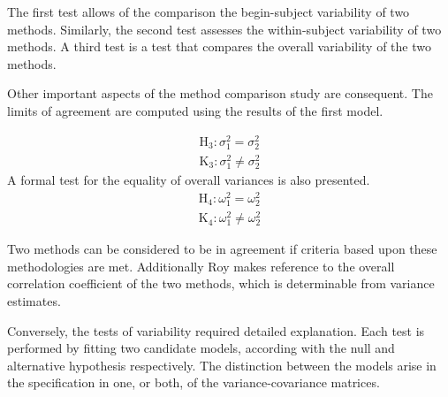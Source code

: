 \documentclass[12pt, a4paper]{report}
\theoremstyle{plain}
\theoremstyle{definition}
\theoremstyle{remark}
\begin{document}
			
			
			The first test allows of the comparison the begin-subject variability of two methods. Similarly, the second test
			assesses the within-subject variability of two methods. A third test is a test that compares the overall variability of the two methods.
			
			Other important aspects of the method comparison study are consequent. The limits of agreement are computed using the results of the first model.
			
			
			\begin{eqnarray*}
				\operatorname{H_3} : \sigma^2_1 = \sigma^2_2 \\
				\operatorname{K_3} : \sigma^2_1 \neq \sigma^2_2
			\end{eqnarray*}
			A formal test for the equality of overall variances is also presented.
			\begin{eqnarray*}
				\operatorname{H_4} : \omega^2_1 = \omega^2_2 \\
				\operatorname{K_4} : \omega^2_1 \neq \omega^2_2
			\end{eqnarray*}
			
			Two methods can be considered to be in agreement if criteria based upon these methodologies are met. Additionally Roy makes reference to the overall correlation coefficient of the two methods, which is determinable from variance estimates.
			
			Conversely, the tests of variability required detailed explanation. Each test is performed by fitting two candidate models, according with the null and alternative hypothesis respectively. The distinction between the models arise in the specification in one, or both, of the variance-covariance matrices. %
			
\end{document}
